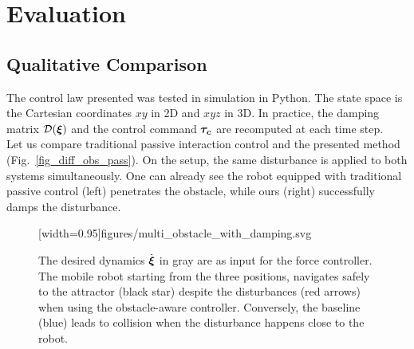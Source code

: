 
\section{Evaluation}  \label{sec:evaluation}

\subsection{Qualitative Comparison} \label{sec:qual_comp}
The control law presented was tested in simulation in Python. The state space is the Cartesian coordinates $xy$ in 2D and $xyz$ in 3D. In practice, the damping matrix $\mathcal{D}(\boldsymbol{\xi})$ and the control command $\boldsymbol{\tau_c}$ are recomputed at each time step.\\

Let us compare traditional passive interaction control and the presented method (Fig.~\ref{fig_diff_obs_pass}). On the setup, the same disturbance is applied to both systems simultaneously. One can already see the robot equipped with traditional passive control (left) penetrates the obstacle, while ours (right) successfully damps the disturbance.


\begin{figure}
  \centering
  \centerline{[width=0.95\columnwidth]{figures/multi_obstacle_with_damping.svg}}
  \caption{The desired dynamics $\dot{\boldsymbol{\xi}}$ in gray are as input for the force controller. 
  The mobile robot starting from the three positions, navigates safely to the attractor (black star) despite the disturbances (red arrows) when using the obstacle-aware controller.
  Conversely, the baseline (blue) leads to collision when the disturbance happens close to the robot.}
  \label{fig:obstacle_aware_damping_comparison}
\end{figure}

